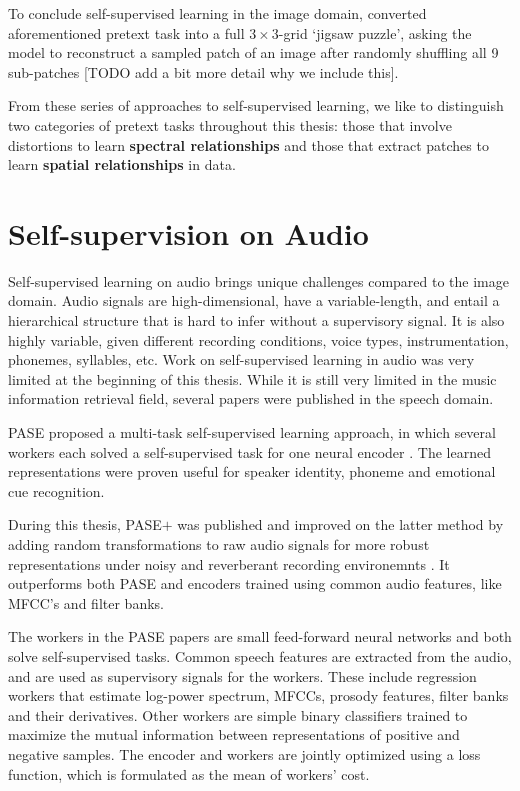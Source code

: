 To conclude self-supervised learning in the image domain, \cite{noroozi_unsupervised_2016} converted aforementioned pretext task into a full $3\times 3$-grid `jigsaw puzzle', asking the model to reconstruct a sampled patch of an image after randomly shuffling all 9 sub-patches [TODO add a bit more detail why we include this].

From these series of approaches to self-supervised learning, we like to distinguish two categories of pretext tasks throughout this thesis: those that involve distortions to learn \textbf{spectral relationships} and those that extract patches to learn \textbf{spatial relationships} in data.
\\

\section{Self-supervision on Audio}
Self-supervised learning on audio brings unique challenges compared to the image domain.
Audio signals are high-dimensional, have a variable-length, and entail a hierarchical structure that is hard to infer without a supervisory signal.
It is also highly variable, given different recording conditions, voice types, instrumentation, phonemes, syllables, etc.
Work on self-supervised learning in audio was very limited at the beginning of this thesis.
While it is still very limited in the music information retrieval field, several papers were published in the speech domain.

PASE proposed a multi-task self-supervised learning approach, in which several workers each solved a self-supervised task for one neural encoder \cite{Pascual2019}.
The learned representations were proven useful for speaker identity, phoneme and emotional cue recognition.

During this thesis, PASE$+$ was published and improved on the latter method by adding random transformations to raw audio signals for more robust representations under noisy and reverberant recording environemnts \cite{Ravanelli2020}.
It outperforms both PASE and encoders trained using common audio features, like MFCC's and filter banks.

The workers in the PASE papers are small feed-forward neural networks and both solve self-supervised tasks.
Common speech features are extracted from the audio, and are used as supervisory signals for the workers.
These include regression workers that estimate log-power spectrum, MFCCs, prosody features, filter banks and their derivatives.
Other workers are simple binary classifiers trained to maximize the mutual information between representations of positive and negative samples.
The encoder and workers are jointly optimized using a loss function, which is formulated as the mean of workers' cost.


